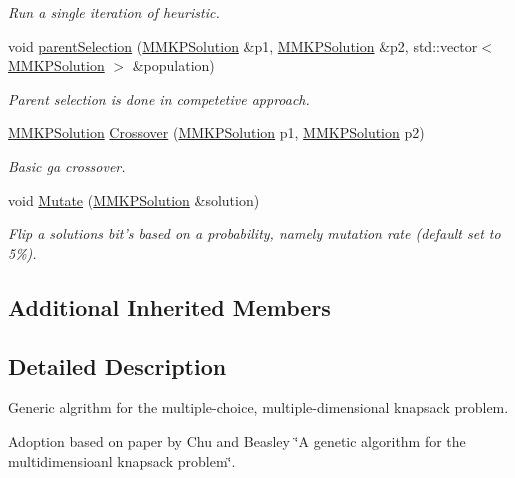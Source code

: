 \begin{DoxyCompactItemize}
\begin{DoxyCompactList}\small\item\em Run a single iteration of heuristic. \end{DoxyCompactList}\item 
void \hyperlink{class_m_m_k_p___g_a_a70ed12ccae6bc93ddfc076086679f3a4}{parent\+Selection} (\hyperlink{class_m_m_k_p_solution}{M\+M\+K\+P\+Solution} \&p1, \hyperlink{class_m_m_k_p_solution}{M\+M\+K\+P\+Solution} \&p2, std\+::vector$<$ \hyperlink{class_m_m_k_p_solution}{M\+M\+K\+P\+Solution} $>$ \&population)
\begin{DoxyCompactList}\small\item\em Parent selection is done in competetive approach. \end{DoxyCompactList}\item 
\hyperlink{class_m_m_k_p_solution}{M\+M\+K\+P\+Solution} \hyperlink{class_m_m_k_p___g_a_a6c58b7d6cf6dc8f3fde50096d8108036}{Crossover} (\hyperlink{class_m_m_k_p_solution}{M\+M\+K\+P\+Solution} p1, \hyperlink{class_m_m_k_p_solution}{M\+M\+K\+P\+Solution} p2)
\begin{DoxyCompactList}\small\item\em Basic ga crossover. \end{DoxyCompactList}\item 
void \hyperlink{class_m_m_k_p___g_a_a196549b88e88b5b0aa705315a4f6ae91}{Mutate} (\hyperlink{class_m_m_k_p_solution}{M\+M\+K\+P\+Solution} \&solution)
\begin{DoxyCompactList}\small\item\em Flip a solutions bit's based on a probability, namely mutation rate (default set to 5\%). \end{DoxyCompactList}\end{DoxyCompactItemize}
\subsection*{Additional Inherited Members}


\subsection{Detailed Description}
Generic algrithm for the multiple-\/choice, multiple-\/dimensional knapsack problem. 

Adoption based on paper by Chu and Beasley \char`\"{}\+A genetic
algorithm for the multidimensioanl knapsack problem\char`\"{}. 

